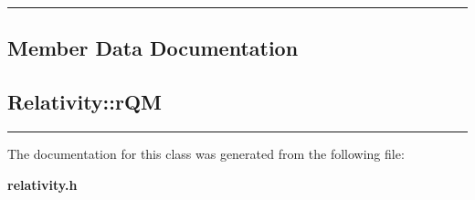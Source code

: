 \vspace{0.4cm}\hrule\vspace{0.2cm}
\subsection*{Member Data Documentation}
\label{Relativity_d6}
\subsection{ Relativity::r\-QM\hspace{0.3cm}{\tt  [static]}}

\vspace{0.4cm}\hrule\vspace{0.2cm}
The documentation for this class was generated from the following file:\begin{CompactItemize}
\item 
{\bf relativity.h}\end{CompactItemize}
